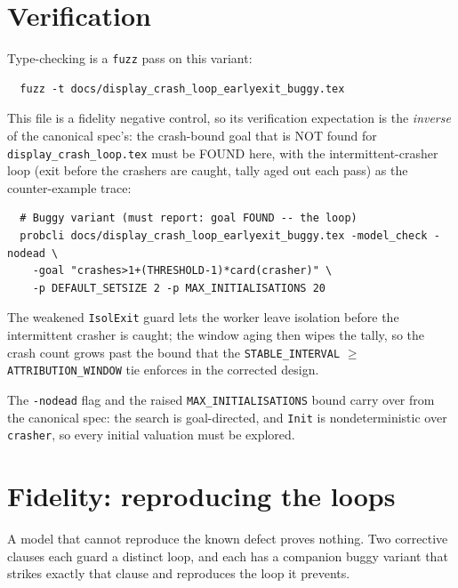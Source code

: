 \documentclass[a4paper,10pt,fleqn]{article}
\begin{document}
\section{Verification}
\label{sec:verify}

Type-checking is a \texttt{fuzz} pass on this variant:
\begin{verbatim}
  fuzz -t docs/display_crash_loop_earlyexit_buggy.tex
\end{verbatim}

This file is a fidelity negative control, so its verification expectation is
the \emph{inverse} of the canonical spec's: the crash-bound goal that is NOT
found for \texttt{display\_crash\_loop.tex} must be FOUND here, with the
intermittent-crasher loop (exit before the crashers are caught, tally aged out each pass) as the counter-example trace:
\begin{verbatim}
  # Buggy variant (must report: goal FOUND -- the loop)
  probcli docs/display_crash_loop_earlyexit_buggy.tex -model_check -nodead \
    -goal "crashes>1+(THRESHOLD-1)*card(crasher)" \
    -p DEFAULT_SETSIZE 2 -p MAX_INITIALISATIONS 20
\end{verbatim}

The weakened \texttt{IsolExit} guard lets the worker leave isolation before
the intermittent crasher is caught; the window aging then wipes the tally,
so the crash count grows past the bound that the \texttt{STABLE\_INTERVAL}
$\geq$ \texttt{ATTRIBUTION\_WINDOW} tie enforces in the corrected design.

The \texttt{-nodead} flag and the raised \texttt{MAX\_INITIALISATIONS} bound
carry over from the canonical spec: the search is goal-directed, and
\texttt{Init} is nondeterministic over \texttt{crasher}, so every initial
valuation must be explored.

\section{Fidelity: reproducing the loops}
\label{sec:fidelity}

A model that cannot reproduce the known defect proves nothing.  Two corrective
clauses each guard a distinct loop, and each has a companion buggy variant that
strikes exactly that clause and reproduces the loop it prevents.
\end{document}
